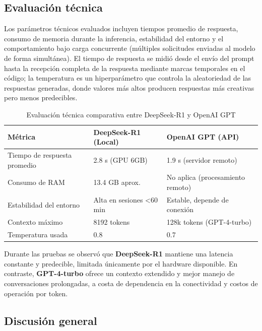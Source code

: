 \documentclass[12pt,a4paper]{report}
\numberwithin{figure}{section}
\begin{document}
\subsection{Evaluación técnica}
\label{subsec:evaluacion_tecnica}

Los parámetros técnicos evaluados incluyen tiempos promedio de respuesta, consumo de memoria durante la inferencia, estabilidad del entorno y el comportamiento bajo carga concurrente (múltiples solicitudes enviadas al modelo de forma simultánea). El tiempo de respuesta se midió desde el envío del prompt hasta la recepción completa de la respuesta mediante marcas temporales en el código; la temperatura es un hiperparámetro que controla la aleatoriedad de las respuestas generadas, donde valores más altos producen respuestas más creativas pero menos predecibles.

\begin{table}[h!]
\centering
\caption{Evaluación técnica comparativa entre DeepSeek-R1 y OpenAI GPT}
\renewcommand{\arraystretch}{1.2}
\begin{tabular}{@{}p{3cm}p{5cm}p{5cm}@{}}
\toprule
\textbf{Métrica} & \textbf{DeepSeek-R1 (Local)} & \textbf{OpenAI GPT (API)} \\
\midrule
Tiempo de respuesta promedio & 2.8 s (GPU 6GB) & 1.9 s (servidor remoto) \\
\midrule
Consumo de RAM & 13.4 GB aprox. & No aplica (procesamiento remoto) \\
\midrule
Estabilidad del entorno & Alta en sesiones <60 min & Estable, depende de conexión \\
\midrule
Contexto máximo & 8192 tokens & 128k tokens (GPT-4-turbo) \\
\midrule
Temperatura usada & 0.8 & 0.7 \\
\bottomrule
\end{tabular}
\end{table}

Durante las pruebas se observó que \textbf{DeepSeek-R1} mantiene una latencia constante y predecible, limitada únicamente por el hardware disponible.  
En contraste, \textbf{GPT-4-turbo} ofrece un contexto extendido y mejor manejo de conversaciones prolongadas, a costa de dependencia en la conectividad y costos de operación por token.

\vspace{1em}

\subsection{Discusión general}
\label{subsec:discusion_general}
\end{document}
